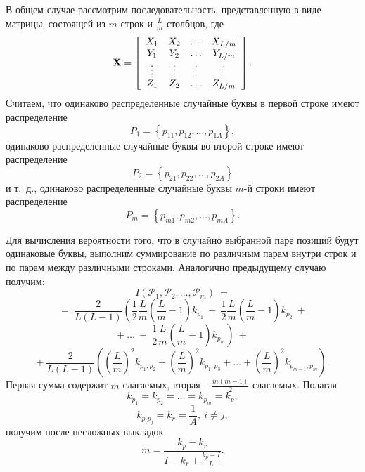 В общем случае рассмотрим последовательность, представленную в виде матрицы, состоящей из $m$  строк и $\frac{L}{m}$ столбцов, где
\[
{\mathbf X} = \left[ {\begin{array}{*{20}c}
   {X_1 } & {X_2 } &  \ldots  & {X_{L/m} }  \\
   {Y_1 } & {Y_2 } &  \ldots  & {Y_{L/m} }  \\
    \vdots  &  \vdots  &  \vdots  &  \vdots   \\
   {Z_1 } & {Z_2 } &  \ldots  & {Z_{L/m} }  \\
\end{array}} \right].
\]
Считаем, что одинаково распределенные случайные буквы в первой строке имеют распределение
    \[ P_1  = \left\{ {p_{11} ,p_{12} ,  \ldots , p_{1A} } \right\}, \]
одинаково распределенные случайные буквы во второй строке имеют распределение
    \[ P_2  = \left\{ {p_{21} ,p_{22} ,  \ldots , p_{2A} } \right\} \]
и т.~д., одинаково распределенные случайные буквы $m$-й строки имеют распределение
    \[ P_m  = \left\{ {p_{m1},p_{m2} ,  \ldots , p_{mA} } \right\}. \]

Для вычисления вероятности того, что в случайно выбранной паре позиций будут одинаковые буквы, выполним суммирование по различным парам внутри строк и по парам между различными строками. Аналогично предыдущему случаю получим:
{ \small
\[
    I(\mathcal{P}_1, \mathcal{P}_2, \ldots, \mathcal{P}_m ) ~=
\] \[
    =~ \frac{2}{L(L - 1)} \left( \frac{1}{2} \frac{L}{m} \left( \frac{L}{m} - 1 \right) k_{p_1} ~+~
        \frac{1}{2} \frac{L}{m} \left( \frac{L}{m} - 1 \right) k_{p_2} ~+ \right.
\] \[
        +~ \dots ~+~ \left. \frac{1}{2} \frac{L}{m} \left( \frac{L}{m} - 1 \right) k_{p_m} \right) ~+
\] \[
       +~ \frac{2}{L(L - 1)} \left( \left( \frac{L}{m} \right)^2 k_{p_1, p_2} +
         \left( \frac{L}{m} \right)^2 k_{p_1, p_3} + \dots +
        \left( \frac{L}{m} \right)^2 k_{p_{m - 1}, p_m } \right).
\] }
Первая сумма содержит  $m$ слагаемых, вторая -- $ \frac{m(m-1)}{2}$ слагаемых. Полагая
    \[ k_{p_1} = k_{p_2} = \dots = k_{p_m} = k_p, \]
    \[ k_{p_i p_j } = k_r = \frac{1}{A}, ~ i \ne j, \]
получим после несложных выкладок
    \[ m = \frac{k_p  - k_r}{I - k_r  + \frac{k_p  - I}{L}}. \]
